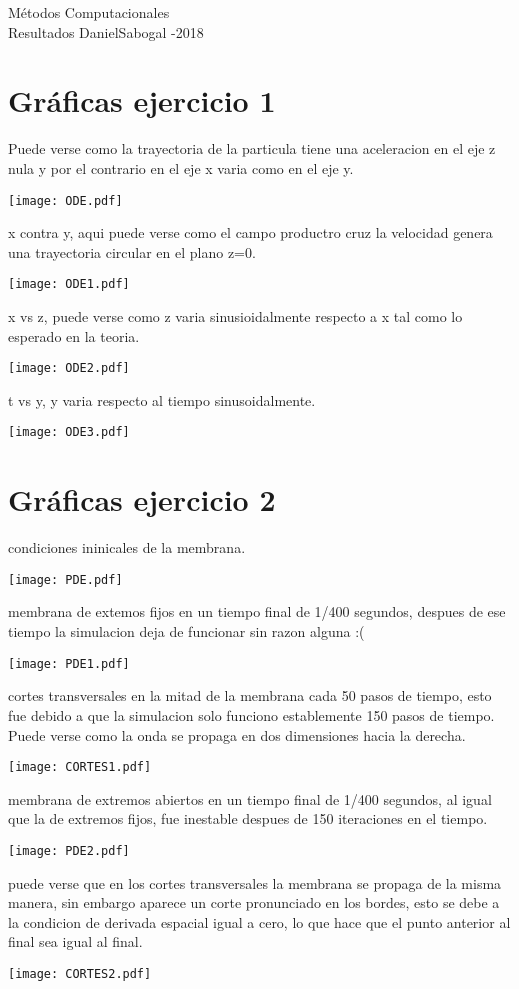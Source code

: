 \documentclass[11pt,letterpaper]{exam}
\begin{document}
\begin{center}
{\Large Métodos Computacionales} \\
Resultados DanielSabogal -2018\\
\end{center}


\noindent
\section{Gr\'aficas ejercicio 1}
Puede verse como la trayectoria de la particula tiene una aceleracion en el eje z nula y por el contrario en el eje x varia como en el eje y.
\begin{center}
\texttt{[image: ODE.pdf]} 
\end{center}
x contra y, aqui puede verse como el campo productro cruz la velocidad genera una trayectoria circular en el plano z=0.
\begin{center}
\texttt{[image: ODE1.pdf]}
\end{center}
x vs z, puede verse como z varia sinusioidalmente respecto a x tal como lo esperado en la teoria.
\begin{center}
\texttt{[image: ODE2.pdf]}
\end{center}
t vs y, y varia respecto al tiempo sinusoidalmente.
\begin{center}
\texttt{[image: ODE3.pdf]}
\end{center}

\section{Gr\'aficas ejercicio 2}
condiciones ininicales de la membrana.
\begin{center}
\texttt{[image: PDE.pdf]}
\end{center}
membrana de extemos fijos en un tiempo final de 1/400 segundos, despues de ese tiempo la simulacion deja de funcionar sin razon alguna :(
\begin{center}
\texttt{[image: PDE1.pdf]}
\end{center}
cortes transversales en la mitad de la membrana cada 50 pasos de tiempo, esto fue debido a que la simulacion solo funciono establemente 150 pasos de tiempo. Puede verse como la onda se propaga en dos dimensiones hacia la derecha.
\begin{center}
\texttt{[image: CORTES1.pdf]}
\end{center}
membrana de extremos abiertos en un tiempo final de 1/400 segundos, al igual que la de extremos fijos, fue inestable despues de 150 iteraciones en el tiempo.
\begin{center}
\texttt{[image: PDE2.pdf]}
\end{center}
puede verse que en los cortes transversales la membrana se propaga de la misma manera, sin embargo aparece un corte pronunciado en los bordes, esto se debe a la condicion de derivada espacial igual a cero, lo que hace que el punto anterior al final sea igual al final.
\begin{center}
\texttt{[image: CORTES2.pdf]}
\end{center}
\end{document}

